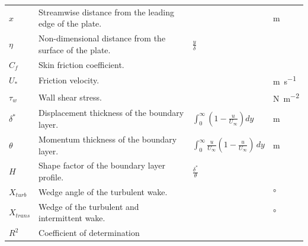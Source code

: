 \documentclass{article}
\begin{document}
\begin{table}[H]
\begin{tabularx}{\textwidth}{l X l l}
        $x$          & Streamwise distance from the leading edge of the plate.                      &          & \unit{\metre}  \\
        $\eta$          & Non-dimensional distance from the surface of the plate.                         &  $\frac{y}{\delta}$       &   \\
        $C_f$          & Skin friction coefficient.                         &          &  \\
        $U_*$          & Friction velocity.                         &          & \unit{\metre \per \second}  \\
        $\tau_w$          & Wall shear stress.                     &          & \unit{\newton \per \metre \squared}  \\
        $\delta^*$          & Displacement thickness of the boundary layer.                     &   $\int_{0}^{\infty} \left( 1 - \frac{u}{U_{\infty}} \right) dy$         & \unit{\metre}  \\
        $\theta$          & Momentum thickness of the boundary layer.                    & $\int_{0}^{\infty} \frac{u}{U_{\infty}} \left( 1 - \frac{u}{U_{\infty}} \right) \, dy$         & \unit{\metre}  \\
        $H$          & Shape factor of the boundary layer profile.                  &  $\frac{\delta^*}{\theta}$        &   \\
        $X_{turb}$          & Wedge angle of the turbulent wake.                        &          & \unit{\degree}  \\
        $X_{trans}$          & Wedge of the turbulent and intermittent wake.           &          & \unit{\degree}  \\
        $R^2$          & Coefficient of determination           &          &   \\

\end{tabularx}
\end{table}
\end{document}
